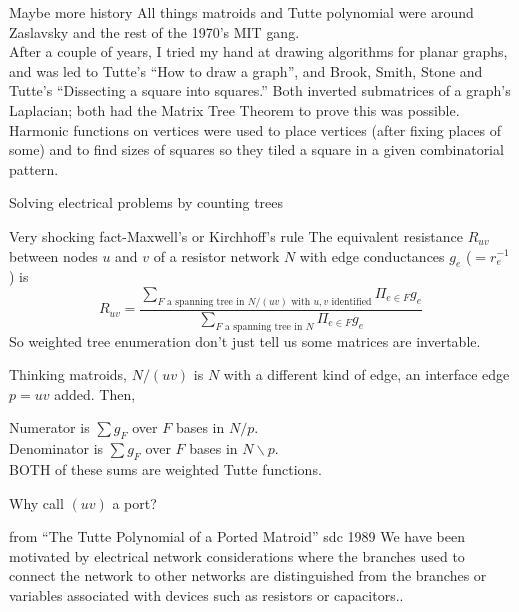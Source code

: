 \documentclass{beamer}
\begin{document}
\begin{frame}{Maybe more history}
  All things matroids and Tutte polynomial were around Zaslavsky and
  the rest of the 1970's MIT gang.  \\
  After a couple of years, I tried my hand at drawing algorithms for planar
  graphs, and was led to Tutte's ``How to draw a graph'', and Brook, Smith, Stone
  and Tutte's ``Dissecting a square into squares.''  Both inverted submatrices of
  a graph's Laplacian; both had the Matrix Tree Theorem to prove this was possible.
  Harmonic functions on vertices were used to place vertices (after fixing places of
  some) and to find sizes of squares so they tiled a square in a given combinatorial
  pattern.  
 \end{frame}
\begin{frame}{Solving electrical problems by counting trees}
   \begin{block}{Very shocking fact-Maxwell's or Kirchhoff's rule}
    The equivalent resistance $R_{uv}$
    between nodes $u$ and $v$ of a resistor network $N$
    with edge conductances $g_e$ ($=r_e^{-1}$) is
    \[
    R_{uv}=\frac{\sum_{F\text{\ a spanning tree in\ } N/(uv) \text{\ with\ } u,v \text{\ identified}}\Pi_{e\in F}g_e}
    {\sum_{F\text{\ a spanning tree in\ } N}\Pi_{e\in F}g_e}
    \]
    So weighted tree enumeration don't just tell us some matrices are invertable.
   \end{block}
   Thinking matroids, $N/(uv)$ is $N$ with a different kind of edge, an interface
   edge $p=uv$ added.  Then,
   \begin{center}
     Numerator is $\sum g_F$ over $F$ bases in $N/p$.\\
     Denominator is $\sum g_F$ over $F$ bases in $N\backslash p$.\\
     BOTH of these sums are weighted Tutte functions.
   \end{center}
\end{frame}

\begin{frame}{Why call $(uv)$ a port?}

  \begin{block}{from ``The Tutte Polynomial of a Ported Matroid'' sdc 1989}
    We have been motivated by electrical network considerations where the
branches used to connect the network to other networks are distinguished
from the branches or variables associated with devices such as resistors or
capacitors..
  \end{block}
\end{frame}
\end{document}
